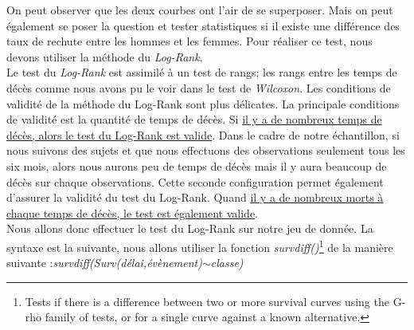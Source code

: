 On peut observer que les deux courbes ont l'air de se superposer. Mais on peut également se poser la question et tester statistiques si il existe une différence des taux de rechute entre les hommes et les femmes. Pour réaliser ce test, nous devons utiliser la méthode du \textit{Log-Rank}.\newline
\\
Le test du \textit{Log-Rank} est assimilé à un test de rangs; les rangs entre les temps de décès comme nous avons pu le voir dans le test de \textit{Wilcoxon}.\newline
Les conditions de validité de la méthode du Log-Rank sont plus délicates.\newline
La principale conditions de validité est la quantité de temps de décès. Si \underline{il y a de nombreux temps de décès, alors le test du Log-Rank est valide}.\newline
Dans le cadre de notre échantillon, si nous suivons des sujets et que nous effectuons des observations seulement tous les six mois, alors nous aurons peu de temps de décès mais il y aura beaucoup de décès sur chaque observations. Cette seconde configuration permet également d'assurer la validité du test du Log-Rank. Quand \underline{il y a de nombreux morts à chaque temps de décès, le test est également valide}.\newline
\\
Nous allons donc effectuer le test du Log-Rank sur notre jeu de donnée. La syntaxe est la suivante, nous allons utiliser la fonction \textit{survdiff()}\footnote{Tests if there is a difference between two or more survival curves using the G-rho family of tests, or for a single curve against a known alternative.} de la manière suivante :\textit{survdiff(Surv(délai,évènement)$\sim$classe)}

